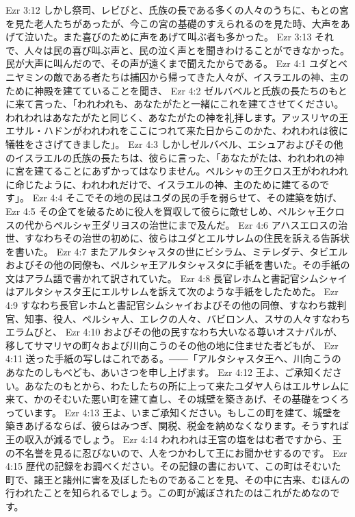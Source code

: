 Ezr 3:12  しかし祭司、レビびと、氏族の長である多くの人々のうちに、もとの宮を見た老人たちがあったが、今この宮の基礎のすえられるのを見た時、大声をあげて泣いた。また喜びのために声をあげて叫ぶ者も多かった。
Ezr 3:13  それで、人々は民の喜び叫ぶ声と、民の泣く声とを聞きわけることができなかった。民が大声に叫んだので、その声が遠くまで聞えたからである。
Ezr 4:1  ユダとベニヤミンの敵である者たちは捕囚から帰ってきた人々が、イスラエルの神、主のために神殿を建てていることを聞き、
Ezr 4:2  ゼルバベルと氏族の長たちのもとに来て言った、「われわれも、あなたがたと一緒にこれを建てさせてください。われわれはあなたがたと同じく、あなたがたの神を礼拝します。アッスリヤの王エサル・ハドンがわれわれをここにつれて来た日からこのかた、われわれは彼に犠牲をささげてきました」。
Ezr 4:3  しかしゼルバベル、エシュアおよびその他のイスラエルの氏族の長たちは、彼らに言った、「あなたがたは、われわれの神に宮を建てることにあずかってはなりません。ペルシャの王クロス王がわれわれに命じたように、われわれだけで、イスラエルの神、主のために建てるのです」。
Ezr 4:4  そこでその地の民はユダの民の手を弱らせて、その建築を妨げ、
Ezr 4:5  その企てを破るために役人を買収して彼らに敵せしめ、ペルシャ王クロスの代からペルシャ王ダリヨスの治世にまで及んだ。
Ezr 4:6  アハスエロスの治世、すなわちその治世の初めに、彼らはユダとエルサレムの住民を訴える告訴状を書いた。
Ezr 4:7  またアルタシャスタの世にビシラム、ミテレダテ、タビエルおよびその他の同僚も、ペルシャ王アルタシャスタに手紙を書いた。その手紙の文はアラム語で書かれて訳されていた。
Ezr 4:8  長官レホムと書記官シムシャイはアルタシャスタ王にエルサレムを訴えて次のような手紙をしたためた。
Ezr 4:9  すなわち長官レホムと書記官シムシャイおよびその他の同僚、すなわち裁判官、知事、役人、ペルシャ人、エレクの人々、バビロン人、スサの人々すなわちエラムびと、
Ezr 4:10  およびその他の民すなわち大いなる尊いオスナパルが、移してサマリヤの町々および川向こうのその他の地に住ませた者どもが、
Ezr 4:11  送った手紙の写しはこれである。――「アルタシャスタ王へ、川向こうのあなたのしもべども、あいさつを申し上げます。
Ezr 4:12  王よ、ご承知ください。あなたのもとから、わたしたちの所に上って来たユダヤ人らはエルサレムに来て、かのそむいた悪い町を建て直し、その城壁を築きあげ、その基礎をつくろっています。
Ezr 4:13  王よ、いまご承知ください。もしこの町を建て、城壁を築きあげるならば、彼らはみつぎ、関税、税金を納めなくなります。そうすれば王の収入が減るでしょう。
Ezr 4:14  われわれは王宮の塩をはむ者ですから、王の不名誉を見るに忍びないので、人をつかわして王にお聞かせするのです。
Ezr 4:15  歴代の記録をお調べください。その記録の書において、この町はそむいた町で、諸王と諸州に害を及ぼしたものであることを見、その中に古来、むほんの行われたことを知られるでしょう。この町が滅ぼされたのはこれがためなのです。
